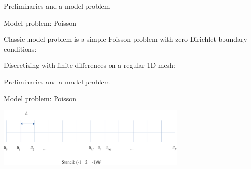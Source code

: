 \documentclass[18pt,xcolor=table]{beamer}
\begin{document}
\begin{frame}{Preliminaries and a model problem}
\begin{block}{Model problem: Poisson}
\bit
\item Classic model problem is a simple Poisson problem with zero Dirichlet boundary conditions:
\item Discretizing with finite differences on a regular 1D mesh:
\eit
{}
\end{block}
\end{frame}

\begin{frame}{Preliminaries and a model problem}
\begin{block}{Model problem: Poisson}
\begin{center}
\includegraphics[width=0.7\textwidth]{../figures/1DFDPoisson}
\end{center}
\end{block}
\end{frame}
\end{document}
